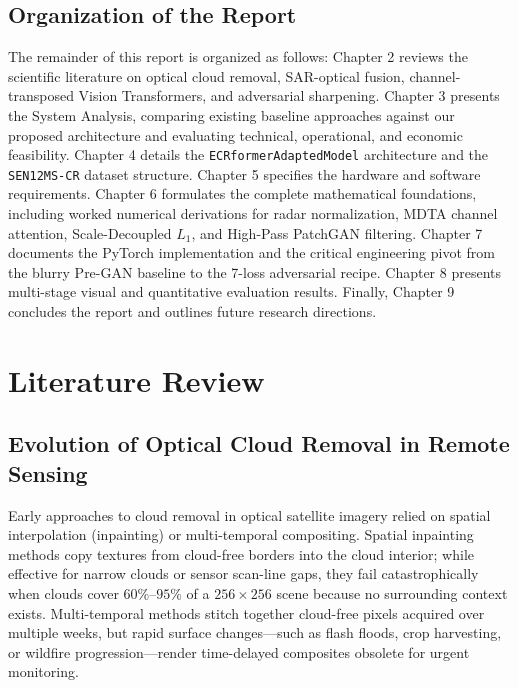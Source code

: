 \documentclass[12pt,a4paper]{report}
\begin{document}
\section{Organization of the Report}
The remainder of this report is organized as follows: Chapter 2 reviews the scientific literature on optical cloud removal, SAR-optical fusion, channel-transposed Vision Transformers, and adversarial sharpening. Chapter 3 presents the System Analysis, comparing existing baseline approaches against our proposed architecture and evaluating technical, operational, and economic feasibility. Chapter 4 details the \texttt{ECRformerAdaptedModel} architecture and the \texttt{SEN12MS-CR} dataset structure. Chapter 5 specifies the hardware and software requirements. Chapter 6 formulates the complete mathematical foundations, including worked numerical derivations for radar normalization, MDTA channel attention, Scale-Decoupled $L_1$, and High-Pass PatchGAN filtering. Chapter 7 documents the PyTorch implementation and the critical engineering pivot from the blurry Pre-GAN baseline to the 7-loss adversarial recipe. Chapter 8 presents multi-stage visual and quantitative evaluation results. Finally, Chapter 9 concludes the report and outlines future research directions.

\chapter{Literature Review}

\section{Evolution of Optical Cloud Removal in Remote Sensing}
Early approaches to cloud removal in optical satellite imagery relied on spatial interpolation (inpainting) or multi-temporal compositing. Spatial inpainting methods copy textures from cloud-free borders into the cloud interior; while effective for narrow clouds or sensor scan-line gaps, they fail catastrophically when clouds cover $60\%$--$95\%$ of a $256\times 256$ scene because no surrounding context exists. Multi-temporal methods stitch together cloud-free pixels acquired over multiple weeks, but rapid surface changes---such as flash floods, crop harvesting, or wildfire progression---render time-delayed composites obsolete for urgent monitoring.
\end{document}
